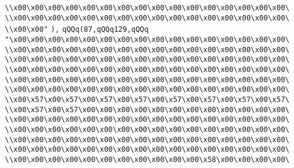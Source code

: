\verb|\\x00\x00\x00\x00\x00\x00\x00\x00\x00\x00\x00\x00\x00\x00\x00\x00\|\newline
\verb|\\x00\x00\x00\x00\x00\x00\x00\x00\x00\x00\x00\x00\x00\x00\x00\x00\|\newline
\verb|\\x00\x00"|\newline
\verb|),|\newline
\verb|qQQq(87,qQQq129,qQQq|\newline
\verb|"\x00\x00\x00\x00\x00\x00\x00\x00\x00\x00\x00\x00\x00\x00\x00\x00\|\newline
\verb|\\x00\x00\x00\x00\x00\x00\x00\x00\x00\x00\x00\x00\x00\x00\x00\x00\|\newline
\verb|\\x00\x00\x00\x00\x00\x00\x00\x00\x00\x00\x00\x00\x00\x00\x00\x00\|\newline
\verb|\\x00\x00\x00\x00\x00\x00\x00\x00\x00\x00\x00\x00\x00\x00\x00\x00\|\newline
\verb|\\x00\x00\x00\x00\x00\x00\x00\x00\x00\x00\x00\x00\x00\x00\x00\x00\|\newline
\verb|\\x00\x00\x00\x00\x00\x00\x00\x00\x00\x00\x00\x00\x00\x00\x00\x00\|\newline
\verb|\\x00\x57\x00\x57\x00\x57\x00\x57\x00\x57\x00\x57\x00\x57\x00\x57\|\newline
\verb|\\x00\x57\x00\x57\x00\x00\x00\x00\x00\x00\x00\x00\x00\x00\x00\x00\|\newline
\verb|\\x00\x00\x00\x00\x00\x00\x00\x00\x00\x00\x00\x00\x00\x00\x00\x00\|\newline
\verb|\\x00\x00\x00\x00\x00\x00\x00\x00\x00\x00\x00\x00\x00\x00\x00\x00\|\newline
\verb|\\x00\x00\x00\x00\x00\x00\x00\x00\x00\x00\x00\x00\x00\x00\x00\x00\|\newline
\verb|\\x00\x00\x00\x00\x00\x00\x00\x00\x00\x00\x00\x00\x00\x00\x00\x00\|\newline
\verb|\\x00\x00\x00\x00\x00\x00\x00\x00\x00\x00\x00\x58\x00\x00\x00\x00\|\newline
